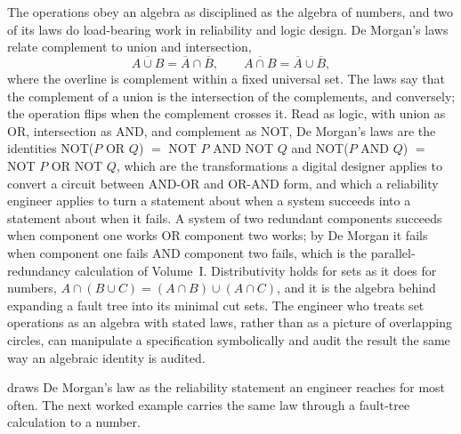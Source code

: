 The operations obey an algebra as disciplined as the algebra of numbers,
and two of its laws do load-bearing work in reliability and logic
design. De Morgan's laws relate complement to union and intersection,
\[
\overline{A \cup B} = \overline{A} \cap \overline{B},
\qquad
\overline{A \cap B} = \overline{A} \cup \overline{B},
\]
where the overline is complement within a fixed universal set. The laws
say that the complement of a union is the intersection of the
complements, and conversely; the operation flips when the complement
crosses it. Read as logic, with union as OR, intersection as AND, and
complement as NOT, De Morgan's laws are the identities NOT($P$ OR $Q$)
$=$ NOT $P$ AND NOT $Q$ and NOT($P$ AND $Q$) $=$ NOT $P$ OR NOT $Q$,
which are the transformations a digital designer applies to convert a
circuit between AND-OR and OR-AND form, and which a reliability engineer
applies to turn a statement about when a system succeeds into a statement
about when it fails. A system of two redundant components succeeds when
component one works OR component two works; by De Morgan it fails when
component one fails AND component two fails, which is the parallel-
redundancy calculation of Volume~I. Distributivity holds for sets as it
does for numbers, $A \cap (B \cup C) = (A \cap B) \cup (A \cap C)$, and
it is the algebra behind expanding a fault tree into its minimal cut
sets. The engineer who treats set operations as an algebra with stated
laws, rather than as a picture of overlapping circles, can manipulate a
specification symbolically and audit the result the same way an algebraic
identity is audited.



 draws De Morgan's law as the
reliability statement an engineer reaches for most often. The next
worked example carries the same law through a fault-tree calculation to
a number.

